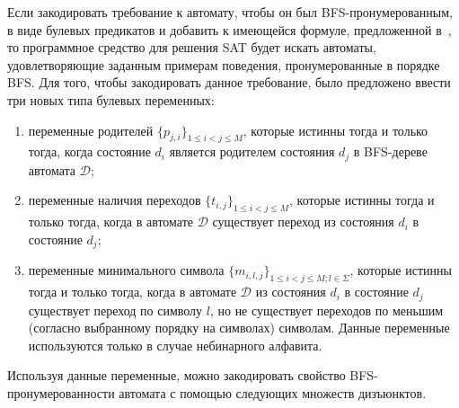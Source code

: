 Если закодировать требование к автомату, чтобы он был BFS-пронумерованным, в виде булевых предикатов и добавить к имеющейся формуле, предложенной в~\cite{heule-icgi10}, то программное средство для решения SAT будет искать автоматы, удовлетворяющие заданным примерам поведения, пронумерованные в порядке BFS.
Для того, чтобы закодировать данное требование, было предложено ввести три новых типа булевых переменных:

\begin{enumerate}
  \item переменные родителей $\{p_{j,i}\}_{1 \leq i < j \leq M}$, которые истинны тогда и только тогда, когда состояние $d_i$ является родителем состояния $d_j$ в BFS-дереве автомата $\mathcal{D}$;
  \item переменные наличия переходов $\{t_{i,j}\}_{1 \leq i < j \leq M}$, которые истинны тогда и только тогда, когда в автомате $\mathcal{D}$ существует переход из состояния $d_{i}$ в состояние $d_{j}$;
  \item переменные минимального символа $\{m_{i,l,j}\}_{1 \leq i < j \leq M;l \in \Sigma}$, которые истинны тогда и только тогда, когда в автомате $\mathcal{D}$ из состояния $d_{i}$ в состояние $d_{j}$ существует переход по символу $l$, но не существует переходов по меньшим (согласно выбранному порядку на символах) символам.
  Данные переменные используются только в случае небинарного алфавита.
\end{enumerate}

Используя данные переменные, можно закодировать свойство BFS-пронумерованности автомата с помощью следующих множеств дизъюнктов.

